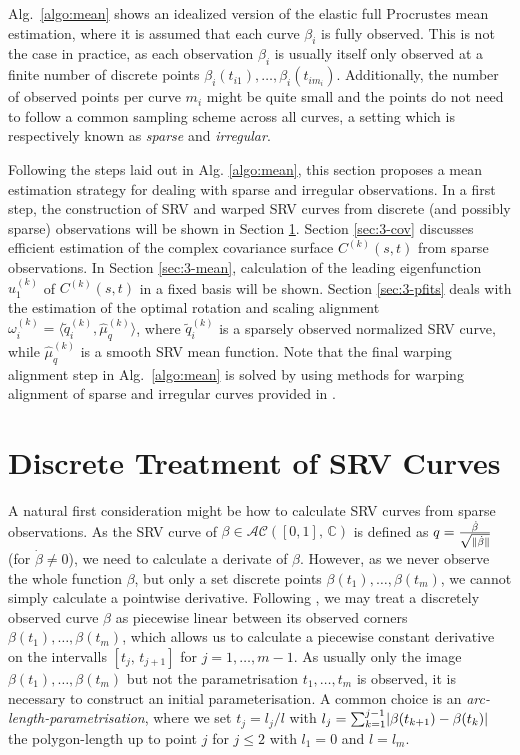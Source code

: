 \label{sec:3}
Alg.\ \ref{algo:mean} shows an idealized version of the elastic full Procrustes mean estimation, where it is assumed that each curve $\beta_i$ is fully observed.
This is not the case in practice, as each observation $\beta_i$ is usually itself only observed at a finite number of discrete points $\beta_i(t_{i1}), \dots, \beta_i(t_{im_i})$.
Additionally, the number of observed points per curve $m_i$ might be quite small and the points do not need to follow a common sampling scheme across all curves, a setting which is respectively known as \emph{sparse} and \emph{irregular}.

Following the steps laid out in Alg. \ref{algo:mean}, this section proposes a mean estimation strategy for dealing with sparse and irregular observations.
In a first step, the construction of SRV and warped SRV curves from discrete (and possibly sparse) observations will be shown in Section \ref{sec:3-discrete}.
Section \ref{sec:3-cov} discusses efficient estimation of the complex covariance surface $C^{(k)}(s,t)$ from sparse observations.
In Section \ref{sec:3-mean}, calculation of the leading eigenfunction $\hat u^{(k)}_1$ of $C^{(k)}(s,t)$ in a fixed basis will be shown.
Section \ref{sec:3-pfits} deals with the estimation of the optimal rotation and scaling alignment $\omega_i^{(k)} = \langle \widetilde q_i^{(k)}, \hat\mu^{(k)}_q \rangle$, where $\widetilde q_i^{(k)}$ is a sparsely observed normalized SRV curve, while $\hat\mu^{(k)}_q$ is a smooth SRV mean function.
Note that the final warping alignment step in Alg.\ \ref{algo:mean} is solved by using methods for warping alignment of sparse and irregular curves provided in \cite{Steyer2021}.


\section{Discrete Treatment of SRV Curves}
\label{sec:3-discrete}
A natural first consideration might be how to calculate SRV curves from sparse observations.
As the SRV curve of $\beta \in \mathcal{AC}([0,1],\,\mathbb{C})$ is defined as $q = \frac{\dot\beta}{\sqrt{\lVert\dot\beta\rVert}}$ (for $\dot\beta \neq 0$), we need to calculate a derivate of $\beta$.
However, as we never observe the whole function $\beta$, but only a set discrete points $\beta(t_1),\dots,\beta(t_m)$, we cannot simply calculate a pointwise derivative.
Following \cite{Steyer2021}, we may treat a discretely observed curve $\beta$ as piecewise linear between its observed corners $\beta(t_1),\dots,\beta(t_m)$, which allows us to calculate a piecewise constant derivative on the intervalls $[t_j,\,t_{j+1}]$ for $j=1,\dots,m-1$.
As usually only the image $\beta(t_1),\dots,\beta(t_m)$ but not the parametrisation $t_1,\dots,t_m$ is observed, it is necessary to construct an initial parameterisation.
A common choice is an \emph{arc-length-parametrisation}, where we set $t_j = l_j/l$ with $l_j = \sum_{k=1}^{j-1} \lvert\beta(t_{k+1}) - \beta(t_k)\rvert$ the polygon-length up to point $j$ for $j \leq 2$ with $l_1 = 0$ and $l= l_m$.

